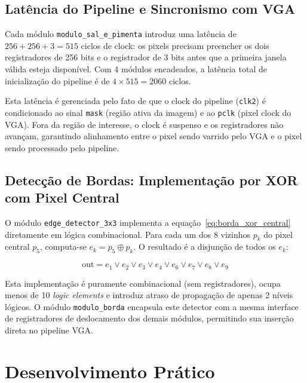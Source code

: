 \documentclass[12pt, a4paper]{article}
\begin{document}
	\subsection{Latência do Pipeline e Sincronismo com VGA}
	
	Cada módulo \texttt{modulo\_sal\_e\_pimenta} introduz uma latência de
	$256 + 256 + 3 = 515$ ciclos de clock: os pixels precisam preencher os dois
	registradores de 256 bits e o registrador de 3 bits antes que a primeira janela
	válida esteja disponível. Com 4 módulos encadeados, a latência total de
	inicialização do pipeline é de $4 \times 515 = 2060$ ciclos.
	
	Esta latência é gerenciada pelo fato de que o clock do pipeline (\texttt{clk2})
	é condicionado ao sinal \texttt{mask} (região ativa da imagem) e ao
	\texttt{pclk} (pixel clock do VGA). Fora da região de interesse, o clock é
	suspenso e os registradores não avançam, garantindo alinhamento entre o pixel
	sendo varrido pelo VGA e o pixel sendo processado pelo pipeline.
	
	\subsection{Detecção de Bordas: Implementação por XOR com Pixel Central}
	
	O módulo \texttt{edge\_detector\_3x3} implementa a equação~\eqref{eq:borda_xor_central}
	diretamente em lógica combinacional. Para cada um dos 8 vizinhos $p_k$ do pixel
	central $p_5$, computa-se $e_k = p_5 \oplus p_k$. O resultado é a disjunção
	de todos os $e_k$:
	
	\begin{equation}
		\text{out} = e_1 \vee e_2 \vee e_3 \vee e_4 \vee e_6 \vee e_7 \vee e_8 \vee e_9
		\label{eq:out_borda}
	\end{equation}
	
	Esta implementação é puramente combinacional (sem registradores), ocupa menos de
	10 \textit{logic elements} e introduz atraso de propagação de apenas 2 níveis
	lógicos. O módulo \texttt{modulo\_borda} encapsula este detector com a mesma
	interface de registradores de deslocamento dos demais módulos, permitindo sua
	inserção direta no pipeline VGA.
	
	\section{Desenvolvimento Prático}
	\label{sec:pratico}
	
\end{document}
